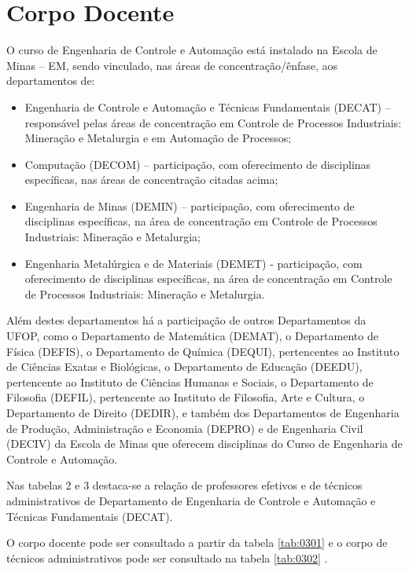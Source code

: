 \section{Corpo Docente}
O curso de Engenharia de Controle e Automação está instalado na Escola de Minas – EM, sendo vinculado, nas áreas de concentração/ênfase, aos departamentos de:
\begin{itemize}
	\item Engenharia de Controle e Automação e Técnicas Fundamentais (DECAT) – responsável pelas áreas de concentração em Controle de Processos Industriais: Mineração e Metalurgia e em Automação de Processos;     
	\item Computação (DECOM) – participação, com oferecimento de disciplinas específicas, nas áreas de concentração citadas acima;
	\item Engenharia de Minas (DEMIN) – participação, com oferecimento de disciplinas específicas, na área de concentração em Controle de Processos Industriais: Mineração e Metalurgia;
	\item Engenharia Metalúrgica e de Materiais (DEMET) - participação, com oferecimento de disciplinas específicas, na área de concentração em Controle de Processos Industriais: Mineração e Metalurgia. 
\end{itemize} 

Além destes departamentos há a participação de outros Departamentos da UFOP, como o Departamento de Matemática (DEMAT), o Departamento de Física (DEFIS), o Departamento de Química (DEQUI), pertencentes ao Instituto de Ciências Exatas e Biológicas, o Departamento de Educação (DEEDU), pertencente ao Instituto de Ciências Humanas e Sociais, o Departamento de Filosofia (DEFIL), pertencente ao Instituto de Filosofia, Arte e Cultura, o Departamento de Direito (DEDIR), e também dos Departamentos de Engenharia de Produção, Administração e Economia (DEPRO) e de Engenharia Civil (DECIV) da Escola de Minas que oferecem disciplinas do Curso de Engenharia de Controle e Automação.

Nas tabelas 2 e 3 destaca-se a relação de professores efetivos e de técnicos administrativos de Departamento de Engenharia de Controle e Automação e Técnicas Fundamentais (DECAT).  

O corpo docente pode ser consultado a partir da tabela \ref{tab:0301} e o corpo de técnicos administrativos pode ser consultado na tabela \ref{tab:0302} .

